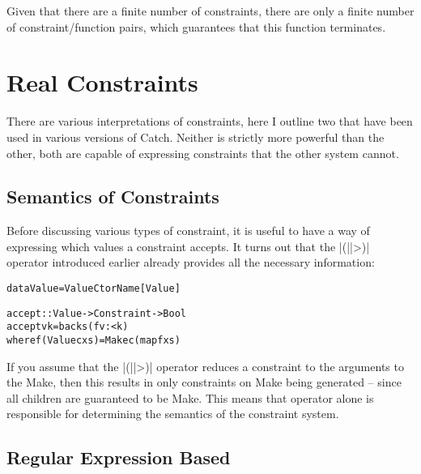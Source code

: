 \documentclass[preprint]{sigplanconf}
\newcommand{\C}[1]{\textsf{#1}}
\newenvironment{code}{\begin{alltt}\small}{\end{alltt}}
\begin{document}
Given that there are a finite number of constraints, there are only a finite number of constraint/function pairs, which guarantees that this function terminates.


\section{Real Constraints}
\label{sec:constraint}

There are various interpretations of constraints, here I outline two that have been used in various versions of Catch. Neither is strictly more powerful than the other, both are capable of expressing constraints that the other system cannot.

\subsection{Semantics of Constraints}

Before discussing various types of constraint, it is useful to have a way of expressing which values a constraint accepts. It turns out that the |(||>)| operator introduced earlier already provides all the necessary information:

\begin{code}
data Value = Value CtorName [Value]

accept :: Value -> Constraint -> Bool
accept v k = backs (f v :< k)
    where f (Value c xs) = Make c (map f xs)
\end{code}

If you assume that the |(||>)| operator reduces a constraint to the arguments to the \C{Make}, then this results in only constraints on \C{Make} being generated -- since all children are guaranteed to be \C{Make}. This means that operator alone is responsible for determining the semantics of the constraint system.

\subsection{Regular Expression Based}
\end{document}
